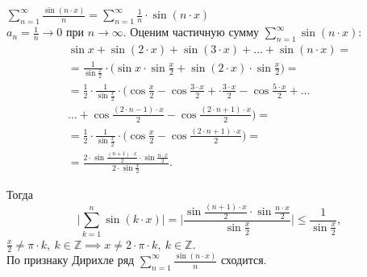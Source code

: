 \begin{example}
    $\sum_{n=1}^{\infty} \frac{\sin (n\cdot x)}{n} = \sum_{n=1}^{\infty} \frac{1}{n} \cdot \sin (n\cdot x)$ \\

    $a_n = \frac{1}{n}\rightarrow 0$ при $n\rightarrow\infty$. Оценим частичную сумму $\sum_{n=1}^{\infty}\sin (n\cdot x)$:
    \begin{multline*}
        \sin x + \sin (2\cdot x) + \sin (3\cdot x) + \ldots + \sin (n\cdot x) = \\
        = \frac{1}{\sin \frac{x}{2}} \cdot \bigg(\sin x \cdot \sin \frac{x}{2} + \sin (2\cdot x) \cdot \sin\frac{x}{2}\bigg) = \\
        = \frac{1}{2} \cdot \frac{1}{\sin\frac{x}{2}} \cdot \bigg(\cos \frac{x}{2} - \cos \frac{3\cdot x}{2} + \cdot \frac{3\cdot x}{2} - \cos \frac{5\cdot x}{2} + \ldots \\
        \ldots + \cos \frac{(2\cdot n-1)\cdot x}{2} - \cos \frac{(2\cdot n+1) \cdot x}{2}\bigg) = \\
        = \frac{1}{2} \cdot \frac{1}{\sin \frac{x}{2}} \cdot \bigg(\cos \frac{x}{2} - \cos \frac{(2\cdot n + 1) \cdot x}{2}\bigg) = \\
        = \frac{2\cdot \sin \frac{(n+1)\cdot x}{2} \cdot \sin \frac{n\cdot x}{2}}{2\cdot \sin \frac{x}{2}}.
    \end{multline*}

    Тогда
    \[
        \bigg|\sum_{k=1}^{n} \sin (k\cdot x)\bigg| = \bigg|\frac{\sin\frac{(n+1)\cdot x}{2}\cdot \sin \frac{n \cdot x}{2}}{\sin \frac{x}{2}}\bigg| \leqslant \frac{1}{\sin\frac{x}{2}},
    \]
    $\frac{x}{2} \ne \pi \cdot k, \ k \in \mathbb{Z} \implies x \ne 2 \cdot \pi \cdot k, \ k \in \mathbb{Z}$. \\

    По признаку Дирихле ряд $\sum_{n=1}^{\infty}\frac{\sin (n\cdot x)}{n}$ сходится.
\end{example}